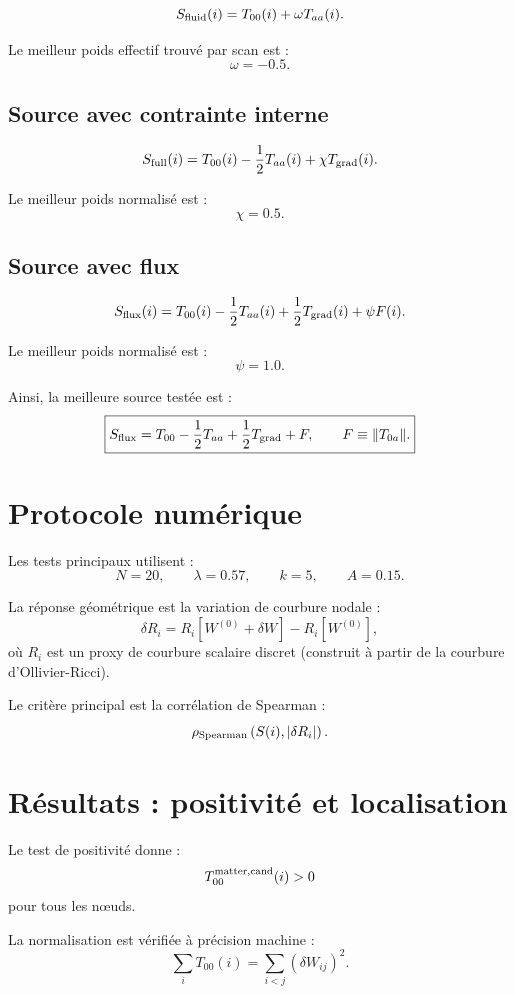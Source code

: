 \documentclass[11pt,a4paper]{article}
\begin{document}
\[
S_{\rm fluid}(i)
=
T_{00}(i)
+
\omega T_{aa}(i).
\]

Le meilleur poids effectif trouvé par scan est :
\[
\omega = -0.5.
\]

\subsection{Source avec contrainte interne}

\[
S_{\rm full}(i)
=
T_{00}(i)
-\frac12 T_{aa}(i)
+
\chi T_{\rm grad}(i).
\]

Le meilleur poids normalisé est :
\[
\chi = 0.5.
\]

\subsection{Source avec flux}

\[
S_{\rm flux}(i)
=
T_{00}(i)
-\frac12 T_{aa}(i)
+
\frac12 T_{\rm grad}(i)
+
\psi F(i).
\]

Le meilleur poids normalisé est :
\[
\psi = 1.0.
\]

Ainsi, la meilleure source testée est :
\[
\boxed{
S_{\rm flux}
=
T_{00}
-\frac12 T_{aa}
+
\frac12 T_{\rm grad}
+
F,
\qquad
F\equiv\|T_{0a}\|.
}
\]

\section{Protocole numérique}

Les tests principaux utilisent :
\[
N = 20,
\qquad
\lambda = 0.57,
\qquad
k = 5,
\qquad
A = 0.15.
\]

La réponse géométrique est la variation de courbure nodale :
\[
\delta R_i
=
R_i[W^{(0)} + \delta W]
-
R_i[W^{(0)}],
\]
où \(R_i\) est un proxy de courbure scalaire discret (construit à partir
de la courbure d'Ollivier-Ricci).

Le critère principal est la corrélation de Spearman :
\[
\rho_{\rm Spearman}
\left(
S(i),
|\delta R_i|
\right).
\]

\section{Résultats : positivité et localisation}

Le test de positivité donne :
\[
T_{00}^{\rm matter,cand}(i) > 0
\]
pour tous les nœuds.

La normalisation est vérifiée à précision machine :
\[
\sum_i T_{00}(i)
=
\sum_{i<j} (\delta W_{ij})^2.
\]
\end{document}
